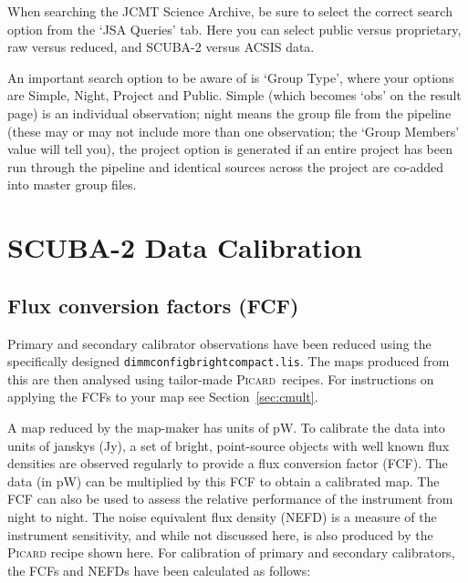 \documentclass[twoside,11pt]{article}
\newcommand{\xref}[3]{#1}
\newcommand{\xlabel}[1]{}
\renewcommand{\_}{\texttt{\symbol{95}}}
\newcommand{\picard}{\xref{\textsc{Picard}}{sun265}{}}
\begin{document}
When searching the JCMT Science Archive, be sure to select the correct
search option from the `JSA Queries' tab. Here you can select public
versus proprietary, raw versus reduced, and SCUBA-2 versus ACSIS data.

An important search option to be aware of is `Group Type', where your
options are Simple, Night, Project and Public. Simple (which becomes
`obs' on the result page) is an individual observation; night means
the group file from the pipeline (these may or may not include more
than one observation; the `Group Members' value will tell you), the
project option is generated if an entire project has been run through
the pipeline and identical sources across the project are co-added
into master group files.

\clearpage
\section{\xlabel{calib}SCUBA-2 Data Calibration}
\label{sec:cal}

\subsection{\xlabel{fcf}Flux conversion factors (FCF)}
\label{sec:fcf}

Primary and secondary calibrator observations have been reduced using
the specifically designed \texttt{dimmconfig\_bright\_compact.lis}.
The maps produced from this are then analysed using tailor-made
\picard\ recipes. For instructions on applying the FCFs to your map see
Section~\ref{sec:cmult}.

A map reduced by the map-maker has units of pW. To calibrate the data
into units of janskys (Jy), a set of bright, point-source objects with
well known flux densities are observed regularly to provide a flux
conversion factor (FCF). The data (in pW) can be multiplied by this FCF
to obtain a calibrated map. The FCF can also be used to assess the
relative performance of the instrument from night to night. The noise
equivalent flux density (NEFD) is a measure of the instrument
sensitivity, and while not discussed here, is also produced by the
\textsc{Picard} recipe shown here. For calibration of primary and secondary
calibrators, the FCFs and NEFDs have been calculated as follows:
\end{document}
